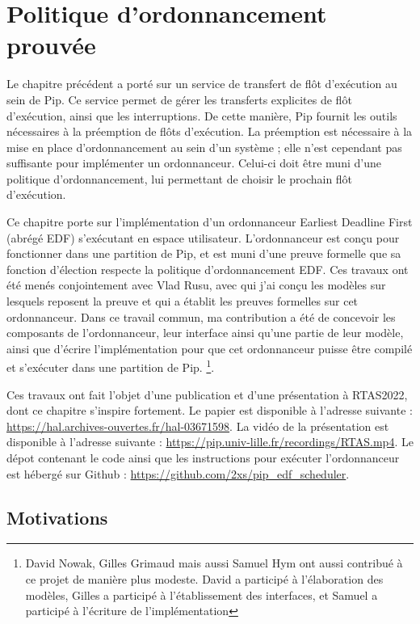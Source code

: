 \chapter{Politique d'ordonnancement prouvée}

	Le chapitre précédent a porté sur un service de transfert de flôt d'exécution au sein de Pip. Ce service permet de gérer les transferts explicites de flôt d'exécution, ainsi que les interruptions. De cette manière, Pip fournit les outils nécessaires à la préemption de flôts d'exécution. La préemption est nécessaire à la mise en place d'ordonnancement au sein d'un système ; elle n'est cependant pas suffisante pour implémenter un ordonnanceur. Celui-ci doit être muni d'une politique d'ordonnancement, lui permettant de choisir le prochain flôt d'exécution.

	Ce chapitre porte sur l'implémentation d'un ordonnanceur Earliest Deadline First (abrégé EDF) s'exécutant en espace utilisateur. L'ordonnanceur est conçu pour fonctionner dans une partition de Pip, et est muni d'une preuve formelle que sa fonction d'élection respecte la politique d'ordonnancement EDF. Ces travaux ont été menés conjointement avec Vlad Rusu, avec qui j'ai conçu les modèles sur lesquels reposent la preuve et qui a établit les preuves formelles sur cet ordonnanceur. Dans ce travail commun, ma contribution a été de concevoir les composants de l'ordonnanceur, leur interface ainsi qu'une partie de leur modèle, ainsi que d'écrire l'implémentation pour que cet ordonnanceur puisse être compilé et s'exécuter dans une partition de Pip.
	\footnote{David Nowak, Gilles Grimaud mais aussi Samuel Hym ont aussi contribué à ce projet de manière plus modeste. David a participé à l'élaboration des modèles, Gilles a participé à l'établissement des interfaces, et Samuel a participé à l'écriture de l'implémentation}.
	
	Ces travaux ont fait l'objet d'une publication et d'une présentation à RTAS2022, dont ce chapitre s'inspire fortement. Le papier est disponible à l'adresse suivante : \url{https://hal.archives-ouvertes.fr/hal-03671598}. La vidéo de la présentation est disponible à l'adresse suivante : \url{https://pip.univ-lille.fr/recordings/RTAS.mp4}. Le dépot contenant le code ainsi que les instructions pour exécuter l'ordonnanceur est hébergé sur Github : \url{https://github.com/2xs/pip_edf_scheduler}.

	\section{Motivations}
	
